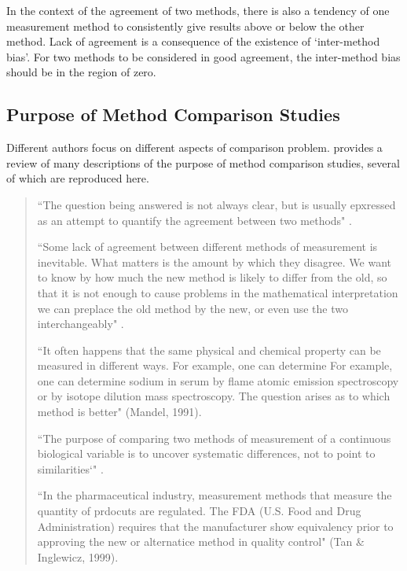 \documentclass[12pt, a4paper]{report}
\theoremstyle{plain}
\theoremstyle{definition}
\theoremstyle{remark}
\begin{document}

In the context of the agreement of two methods, there is also a
tendency of one measurement method to consistently give results
above or below the other method. Lack of agreement is a
consequence of the existence of `inter-method bias'. For two
methods to be considered in good agreement, the inter-method bias
should be in the region of zero.

	\subsection{Purpose of Method Comparison Studies}
	Different authors focus on different aspects of comparison problem. \citet{BXC2010} provides a review of many descriptions of the purpose of method comparison studies, several of which are reproduced here.
	
	\begin{quote}
		``The question being answered is not always clear, but is usually epxressed as an attempt to quantify the agreement
		between two methods" \citep{BA95}.
		
		``Some lack of agreement between different methods of measurement is inevitable. What matters is the amount by which they disagree. We want to know by how much the new method is likely to differ from the old, so that it is not enough to cause problems in the mathematical interpretation we can preplace the old method by the new, or even use the two interchangeably" \citep{BA99}.
		
		
		``It often happens that the same physical and chemical property can be measured in different ways. For example, one can determine For example, one can determine sodium in serum by flame atomic emission spectroscopy or by isotope dilution mass spectroscopy. The question arises as to which method is better" (Mandel, 1991).
		
		
		``The purpose of comparing two methods of measurement of a continuous biological variable is to uncover systematic differences, not to point to
		similarities`" \citep{ludbrook97}.
		
		``In the pharmaceutical industry, measurement methods that measure the quantity of prdocuts are regulated. The FDA (U.S. Food and Drug Administration) requires that the manufacturer show equivalency prior to approving the new or alternatice method in quality control" (Tan \& Inglewicz, 1999). 
	\end{quote}
	
\end{document}
